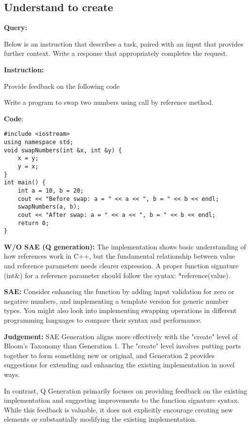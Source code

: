 \medskip
\subsection*{Understand to create}
\textbf{Query:}

Below is an instruction that describes a task, paired with an input that provides further context. Write a response that appropriately completes the request.\par
\textbf{Instruction:}\par
Provide feedback on the following code \par
Write a program to swap two numbers using call by reference method.\par

\textbf{Code}:
\begin{lstlisting}
#include <iostream>
using namespace std;
void swapNumbers(int &x, int &y) {
    x = y;
    y = x;
}
int main() {
    int a = 10, b = 20;
    cout << "Before swap: a = " << a << ", b = " << b << endl;
    swapNumbers(a, b);
    cout << "After swap: a = " << a << ", b = " << b << endl;
    return 0;
}
\end{lstlisting}


\textbf{W/O SAE (Q generation):} The implementation shows basic understanding of how references work in C++, but the fundamental relationship between value and reference parameters needs clearer expression. A proper function signature (int$\&$) for a reference parameter should follow the syntax: *reference(value). \par

\textbf{SAE:}  Consider enhancing the function by adding input validation for zero or negative numbers, and implementing a template version for generic number types. You might also look into implementing swapping operations in different programming languages to compare their syntax and performance. \par


\textbf{Judgement:}  SAE Generation  aligns more effectively with the "create" level of Bloom's Taxonomy than Generation 1. The "create" level involves putting parts together to form something new or original, and Generation 2 provides suggestions for extending and enhancing the existing implementation in novel ways.


In contrast, Q Generation  primarily focuses on providing feedback on the existing implementation and suggesting improvements to the function signature syntax. While this feedback is valuable, it does not explicitly encourage creating new elements or substantially modifying the existing implementation.






